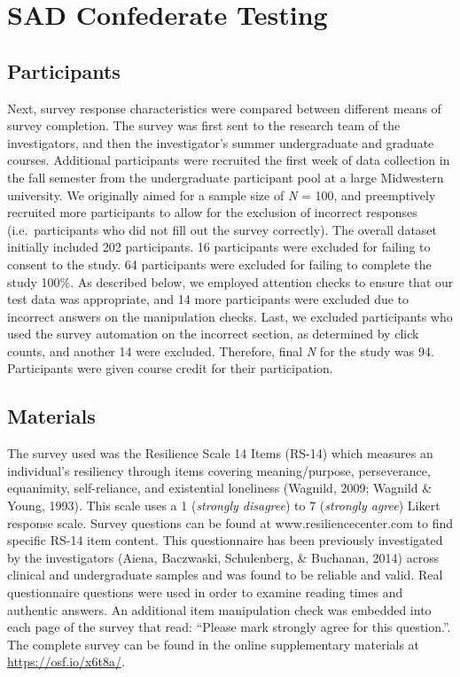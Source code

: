 \documentclass[english,man]{apa6}
\theoremstyle{definition}
\theoremstyle{definition}
\theoremstyle{definition}
\theoremstyle{remark}
\begin{document}
\section{SAD Confederate Testing}\label{sad-confederate-testing}

\subsection{Participants}\label{participants}

Next, survey response characteristics were compared between different
means of survey completion. The survey was first sent to the research
team of the investigators, and then the investigator's summer
undergraduate and graduate courses. Additional participants were
recruited the first week of data collection in the fall semester from
the undergraduate participant pool at a large Midwestern university. We
originally aimed for a sample size of \emph{N} = 100, and preemptively
recruited more participants to allow for the exclusion of incorrect
responses (i.e.~participants who did not fill out the survey correctly).
The overall dataset initially included 202 participants. 16 participants
were excluded for failing to consent to the study. 64 participants were
excluded for failing to complete the study 100\%. As described below, we
employed attention checks to ensure that our test data was appropriate,
and 14 more participants were excluded due to incorrect answers on the
manipulation checks. Last, we excluded participants who used the survey
automation on the incorrect section, as determined by click counts, and
another 14 were excluded. Therefore, final \emph{N} for the study was
94. Participants were given course credit for their participation.

\subsection{Materials}\label{materials}

The survey used was the Resilience Scale 14 Items (RS-14) which measures
an individual's resiliency through items covering meaning/purpose,
perseverance, equanimity, self-reliance, and existential loneliness
(Wagnild, 2009; Wagnild \& Young, 1993). This scale uses a 1
(\emph{strongly disagree}) to 7 (\emph{strongly agree}) Likert response
scale. Survey questions can be found at www.resiliencecenter.com to find
specific RS-14 item content. This questionnaire has been previously
investigated by the investigators (Aiena, Baczwaski, Schulenberg, \&
Buchanan, 2014) across clinical and undergraduate samples and was found
to be reliable and valid. Real questionnaire questions were used in
order to examine reading times and authentic answers. An additional item
manipulation check was embedded into each page of the survey that read:
\enquote{Please mark strongly agree for this question.}. The complete
survey can be found in the online supplementary materials at
\url{https://osf.io/x6t8a/}.
\end{document}
